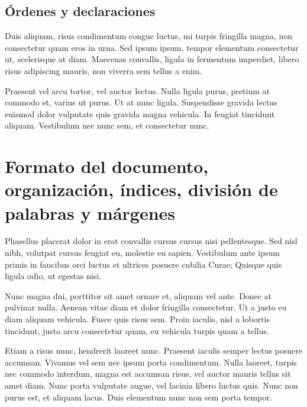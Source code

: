 \documentclass[12pt,a4paper]{report}
\begin{document}
\section{Órdenes y declaraciones}
\label{seccion.ordenes}



Duis aliquam, risus condimentum congue luctus, mi turpis fringilla magna, non consectetur quam eros in urna. Sed ipsum ipsum, tempor elementum consectetur ut, scelerisque at diam. Maecenas convallis, ligula in fermentum imperdiet, libero risus adipiscing mauris, non viverra sem tellus a enim.

Praesent vel arcu tortor, vel auctor lectus. Nulla ligula purus, pretium at commodo et, varius ut purus. Ut at nunc ligula. Suspendisse gravida lectus euismod dolor vulputate quis gravida magna vehicula. In feugiat tincidunt aliquam. Vestibulum nec nunc sem, et consectetur nunc. 






\chapter[Formato del documento]{Formato del documento, organización, índices, división de palabras y márgenes}\label{tema.formato}



Phasellus placerat dolor in erat convallis cursus cursus nisi pellentesque. Sed nisl nibh, volutpat cursus feugiat eu, molestie eu sapien. Vestibulum ante ipsum primis in faucibus orci luctus et ultrices posuere cubilia Curae; Quisque quis ligula odio, ut egestas nisi. 

Nunc magna dui, porttitor sit amet ornare et, aliquam vel ante. Donec at pulvinar nulla. Aenean vitae diam et dolor fringilla consectetur. Ut a justo eu diam aliquam vehicula. Fusce quis risus sem. Proin iaculis, nisl a lobortis tincidunt, justo arcu consectetur quam, eu vehicula turpis quam a tellus.

Etiam a risus nunc, hendrerit laoreet nunc. Praesent iaculis semper lectus posuere accumsan. Vivamus vel sem nec ipsum porta condimentum. Nulla laoreet, turpis nec commodo interdum, magna est accumsan risus, vel auctor mauris tellus sit amet diam. Nunc porta vulputate augue, vel lacinia libero luctus quis. Nunc non purus est, et aliquam lacus. Duis elementum nunc non sem porta tempor.
\end{document}
